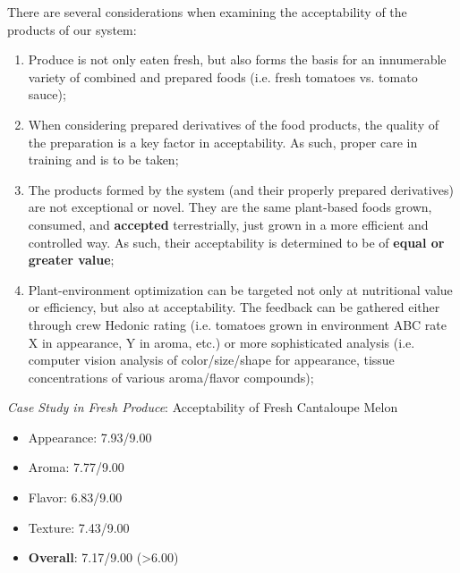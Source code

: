 \documentclass{report}
\begin{document}




There are several considerations when examining the acceptability of the products of our system:

\begin{enumerate}
    \item Produce is not only eaten fresh, but also forms the basis for an innumerable variety of combined and prepared foods (i.e. fresh tomatoes vs. tomato sauce);
    \item When considering prepared derivatives of the food products, the quality of the preparation is a key factor in acceptability. As such, proper care in training and is to be taken;
    \item The products formed by the system (and their properly prepared derivatives) are not exceptional or novel. They are the same plant-based foods grown, consumed, and \textbf{accepted} terrestrially, just grown in a more efficient and controlled way. As such, their acceptability is determined to be of \textbf{equal or greater value};
    \item Plant-environment optimization can be targeted not only at nutritional value or efficiency, but also at acceptability. The feedback can be gathered either through crew Hedonic rating (i.e. tomatoes grown in environment ABC rate X in appearance, Y in aroma, etc.) or more sophisticated analysis (i.e. computer vision analysis of color/size/shape for appearance, tissue concentrations of various aroma/flavor compounds); %
\end{enumerate}

\textit{Case Study in Fresh Produce}: Acceptability of Fresh Cantaloupe Melon %

\begin{itemize}
    \item Appearance: 7.93/9.00
    \item Aroma: 7.77/9.00
    \item Flavor: 6.83/9.00
    \item Texture: 7.43/9.00
    \item \textbf{Overall}: 7.17/9.00 (>6.00)
\end{itemize}
\end{document}
